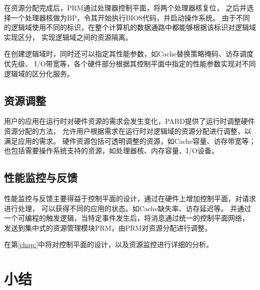 在资源分配完成后，PRM通过处理器控制平面，将两个处理器核复位，
之后并选择一个处理器核做为BP，令其开始执行BIOS代码，并启动操作系统。
由于不同的逻辑域使用不同的标识，在整个计算机的数据通路中都能够根据该标识对逻辑域实现区分，
实现逻辑域之间的资源隔离。

在创建逻辑域时，同时还可以指定其性能参数，如Cache替换策略掩码、访存调度优先级、
I/O带宽等，各个硬件部分根据其控制平面中指定的性能参数实现对不同逻辑域的区分化服务。


\subsection{资源调整}

用户的应用在运行时对硬件资源的需求会发生变化，PARD提供了运行时调整硬件资源分配的方法，
允许用户根据需求在运行时对逻辑域的资源分配进行调整，以满足应用的需求。
硬件资源包括可透明调整的资源，如Cache容量、访存带宽等；
也包括需要操作系统支持的资源，如处理器核、内存容量、I/O设备。




\subsection{性能监控与反馈}

性能监控与反馈主要得益于控制平面的设计，通过在硬件上增加控制平面，对请求进行处理，
可以获得不同的应用的状态。如Cache缺失率、访存延迟等。
并通过一个可编程的触发逻辑，当特定事件发生后，将消息通过统一的控制平面网络，
发送到集中式的资源管理模块PRM，由PRM对资源分配进行调整。

在第\ref{chap:}中将对控制平面的设计，以及资源监控进行详细的分析。


\section{小结}


